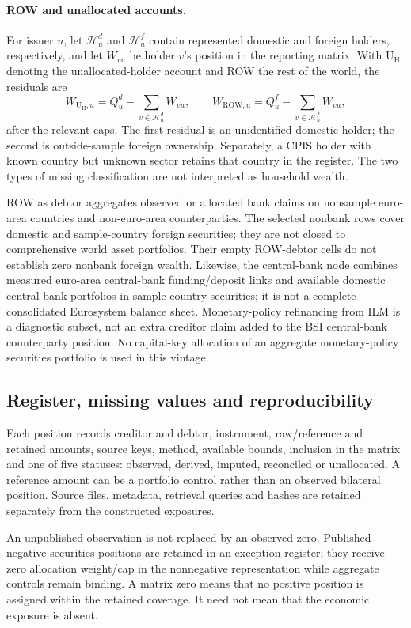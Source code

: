 \paragraph{ROW and unallocated accounts.}
For issuer $u$, let $\mathcal H_u^d$ and $\mathcal H_u^f$ contain represented domestic and foreign holders, respectively, and let $W_{vu}$ be holder $v$'s position in the reporting matrix. With $\mathrm{U_H}$ denoting the unallocated-holder account and ROW the rest of the world, the residuals are
\[
 W_{\mathrm{U_H},u}=Q_u^d-\sum_{v\in\mathcal H_u^d}W_{vu},
 \qquad
 W_{\mathrm{ROW},u}=Q_u^f-\sum_{v\in\mathcal H_u^f}W_{vu},
\]
after the relevant caps. The first residual is an unidentified domestic holder; the second is outside-sample foreign ownership. Separately, a CPIS holder with known country but unknown sector retains that country in the register. The two types of missing classification are not interpreted as household wealth.

ROW as debtor aggregates observed or allocated bank claims on nonsample euro-area countries and non-euro-area counterparties. The selected nonbank rows cover domestic and sample-country foreign securities; they are not closed to comprehensive world asset portfolios. Their empty ROW-debtor cells do not establish zero nonbank foreign wealth. Likewise, the central-bank node combines measured euro-area central-bank funding/deposit links and available domestic central-bank portfolios in sample-country securities; it is not a complete consolidated Eurosystem balance sheet. Monetary-policy refinancing from ILM is a diagnostic subset, not an extra creditor claim added to the BSI central-bank counterparty position. No capital-key allocation of an aggregate monetary-policy securities portfolio is used in this vintage.

\subsection{Register, missing values and reproducibility}

Each position records creditor and debtor, instrument, raw/reference and retained amounts, source keys, method, available bounds, inclusion in the matrix and one of five statuses: observed, derived, imputed, reconciled or unallocated. A reference amount can be a portfolio control rather than an observed bilateral position. Source files, metadata, retrieval queries and hashes are retained separately from the constructed exposures.

An unpublished observation is not replaced by an observed zero. Published negative securities positions are retained in an exception register; they receive zero allocation weight/cap in the nonnegative representation while aggregate controls remain binding. A matrix zero means that no positive position is assigned within the retained coverage. It need not mean that the economic exposure is absent.

